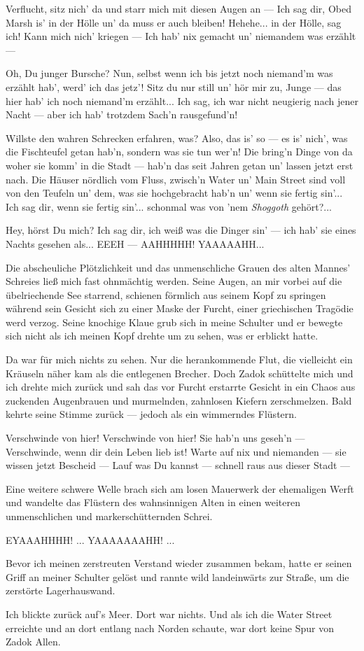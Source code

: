 \glqq Verflucht, sitz nich' da und starr mich mit diesen Augen an --- Ich sag dir, Obed Marsh is' in der Hölle un' da muss er auch bleiben! Hehehe... in der Hölle, sag ich! Kann mich nich' kriegen --- Ich hab' nix gemacht un' niemandem was erzählt ---

Oh, Du junger Bursche? Nun, selbst wenn ich bis jetzt noch niemand'm was erzählt hab', werd' ich das jetz'! Sitz du nur still un' hör mir zu, Junge --- das hier hab' ich noch niemand'm erzählt... Ich sag, ich war nicht neugierig nach jener Nacht --- aber ich hab' trotzdem Sach'n rausgefund'n!

Willste den wahren Schrecken erfahren, was? Also, das is' so --- es is' nich', was die Fischteufel getan hab'n, sondern was sie tun wer'n! Die bring'n Dinge von da woher sie komm' in die  Stadt --- hab'n das seit Jahren getan un' lassen jetzt erst nach. Die Häuser nördlich vom Fluss, zwisch'n Water un' Main Street sind voll von den Teufeln un' dem, was sie hochgebracht hab'n un' wenn sie fertig sin'... Ich sag dir, wenn sie fertig sin'... schonmal was von 'nem \textit{Shoggoth} gehört?...

Hey, hörst Du mich? Ich sag dir, ich weiß was die Dinger sin' --- ich hab' sie eines Nachts gesehen als... EEEH --- AAHHHHH! YAAAAAHH...
\grqq

Die abscheuliche Plötzlichkeit und das unmenschliche Grauen des alten Mannes' Schreies ließ mich fast ohnmächtig werden. Seine Augen, an mir vorbei auf die übelriechende See starrend, schienen förmlich aus seinem Kopf zu springen während sein Gesicht sich zu einer Maske der Furcht, einer griechischen Tragödie werd verzog. Seine knochige Klaue grub sich in meine Schulter und er bewegte sich nicht als ich meinen Kopf drehte um zu sehen, was er erblickt hatte.

Da war für mich nichts zu sehen. Nur die herankommende Flut, die vielleicht ein Kräuseln näher kam als die entlegenen Brecher. Doch Zadok schüttelte mich und ich drehte mich zurück und sah das vor Furcht erstarrte Gesicht in ein Chaos aus zuckenden Augenbrauen und murmelnden, zahnlosen Kiefern zerschmelzen. Bald kehrte seine Stimme zurück --- jedoch als ein wimmerndes Flüstern.

\glqq Verschwinde von hier! Verschwinde von hier! Sie hab'n uns geseh'n --- Verschwinde, wenn dir dein Leben lieb ist! Warte auf nix und niemanden --- sie wissen jetzt Bescheid --- Lauf was Du kannst --- schnell raus aus dieser Stadt ---
\grqq

Eine weitere schwere Welle brach sich am losen Mauerwerk der ehemaligen Werft und wandelte das Flüstern des wahnsinnigen Alten in einen weiteren unmenschlichen und markerschütternden Schrei.

\glqq EYAAAHHHH! ... YAAAAAAAHH! ...\grqq

Bevor ich meinen zerstreuten Verstand wieder zusammen bekam, hatte er seinen Griff an meiner Schulter gelöst und rannte wild landeinwärts zur Straße, um die zerstörte Lagerhauswand.

Ich blickte zurück auf's Meer. Dort war nichts. Und als ich die Water Street erreichte und an dort entlang nach Norden schaute, war dort keine Spur von Zadok Allen.
